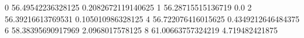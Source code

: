 0 56.49542236328125 0.2082672119140625
1 56.28715515136719 0.0
2 56.39216613769531 0.105010986328125
4 56.722076416015625 0.4349212646484375
6 58.38395690917969 2.0968017578125
8 61.00663757324219 4.719482421875
